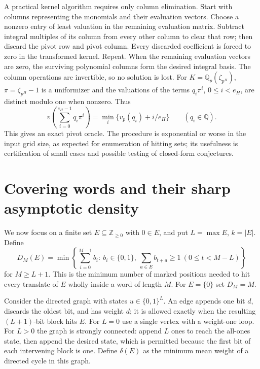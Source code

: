 \documentclass[11pt]{article}
\theoremstyle{definition}
\newcommand{\Qp}{\mathbb Q_p}
\newcommand{\Z}{\mathbb Z}
\begin{document}
A practical kernel algorithm requires only column elimination. Start with columns representing the monomials and their evaluation vectors. Choose a nonzero entry of least valuation in the remaining evaluation matrix. Subtract integral multiples of its column from every other column to clear that row; then discard the pivot row and pivot column. Every discarded coefficient is forced to zero in the transformed kernel. Repeat. When the remaining evaluation vectors are zero, the surviving polynomial columns form the desired integral basis. The column operations are invertible, so no solution is lost. For $K=\Qp(\zeta_{p^H})$, $\pi=\zeta_{p^H}-1$ is a uniformizer and the valuations of the terms $q_i\pi^i$, $0\le i<e_H$, are distinct modulo one when nonzero. Thus
\[
 v\left(\sum_{i=0}^{e_H-1}q_i\pi^i\right)
 =\min_i\{v_p(q_i)+i/e_H\}\qquad(q_i\in\mathbb Q).
\]
This gives an exact pivot oracle. The procedure is exponential or worse in the input grid size, as expected for enumeration of hitting sets; its usefulness is certification of small cases and possible testing of closed-form conjectures.

\section{Covering words and their sharp asymptotic density}\label{sec:words}

We now focus on a finite set $E\subseteq\Z_{\ge0}$ with $0\in E$, and put $L=\max E$, $k=|E|$. Define
\begin{equation}\label{eq:D}
 D_M(E)=\min\left\{\sum_{i=0}^{M-1} b_i:\ b_i\in\{0,1\},\ \sum_{a\in E} b_{t+a}\ge1\ (0\le t<M-L)\right\}
\end{equation}
for $M\ge L+1$. This is the minimum number of marked positions needed to hit every translate of $E$ wholly inside a word of length $M$. For $E=\{0\}$ set $D_M=M$.

Consider the directed graph with states $u\in\{0,1\}^L$. An edge appends one bit $d$, discards the oldest bit, and has weight $d$; it is allowed exactly when the resulting $(L+1)$-bit block hits $E$. For $L=0$ use a single vertex with a weight-one loop. For $L>0$ the graph is strongly connected: append $L$ ones to reach the all-ones state, then append the desired state, which is permitted because the first bit of each intervening block is one. Define $\delta(E)$ as the minimum mean weight of a directed cycle in this graph.
\end{document}
